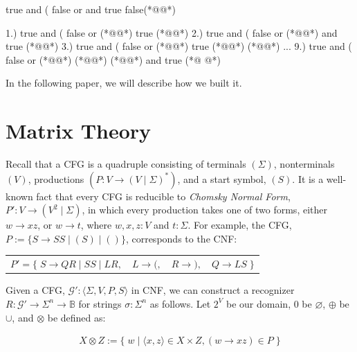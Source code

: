 \documentclass[sigplan,nonacm]{acmart}\settopmatter{printfolios=false,printccs=false,printacmref=false}
\begin{document}
\begin{tidyinput}
true and ( false or and true false(*@\caret{ }@*)
\end{tidyinput}

\begin{tidyoutput}
1.) true and ( false or (*@\hlorange{!}@*) true (*@\hlorange{)}@*)
2.) true and ( false or (*@@*) and true (*@\hlorange{)}@*)
3.) true and ( false or (*@\hlorange{(}@*) true (*@\hlorange{)}@*) (*@\hlgreen{)}@*)
...
9.) true and ( false or (*@\hlgreen{!}@*) (*@@*) (*@\hlgreen{)}@*) and true (*@ @*)
\end{tidyoutput}

\noindent In the following paper, we will describe how we built it.

\section{Matrix Theory}

Recall that a CFG is a quadruple consisting of terminals $(\Sigma)$, nonterminals $(V)$, productions $(P\colon V \rightarrow (V \mid \Sigma)^*)$, and a start symbol, $(S)$. It is a well-known fact that every CFG is reducible to \textit{Chomsky Normal Form}, $P'\colon V \rightarrow (V^2 \mid \Sigma)$, in which every production takes one of two forms, either $w \rightarrow xz$, or $w \rightarrow t$, where $w, x, z: V$ and $t: \Sigma$. For example, the CFG, $P:=\{S \rightarrow S S \mid ( S ) \mid ()\}$, corresponds to the CNF:\vspace{-3pt}

\begin{table}[H]
  \begin{tabular}{llll}
    $P'=\big\{\;S\rightarrow QR \mid SS \mid LR,$ & $L \rightarrow (,$ & $R \rightarrow ),$ & $Q\rightarrow LS\;\big\}$
  \end{tabular}
\end{table}\vspace{-8pt}

\noindent Given a CFG, $\mathcal{G}' : \langle \Sigma, V, P, S\rangle$ in CNF, we can construct a recognizer $R: \mathcal{G}' \rightarrow \Sigma^n \rightarrow \mathbb{B}$ for strings $\sigma: \Sigma^n$ as follows. Let $2^V$ be our domain, $0$ be $\varnothing$, $\oplus$ be $\cup$, and $\otimes$ be defined as:\vspace{-10pt}

\begin{align}
  X \otimes Z := \big\{\;w \mid \langle x, z\rangle \in X \times Z, (w\rightarrow xz) \in P\;\big\}
\end{align}
\end{document}
